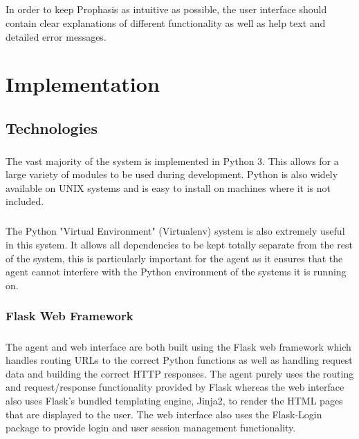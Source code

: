 \documentclass[bsc,logo,twoside]{infthesis}
\begin{document}
\paragraph*{}
	In order to keep Prophasis as intuitive as possible, the user interface should
	contain clear explanations of different functionality as well as help text and
	detailed error messages.

\chapter{Implementation}
\section{Technologies}
\paragraph*{}
	The vast majority of the system is implemented in Python 3.  This allows for a
	large variety of modules to be used during development. Python is also widely
	available on UNIX systems and is easy to install on machines where it is not
	included.

\paragraph*{}
	The Python "Virtual Environment" (Virtualenv) system is also extremely useful
	in this system.  It allows all dependencies to be kept totally separate from
	the rest of the system, this is particularly important for the agent as it
	ensures that the agent cannot interfere with the Python environment of the
	systems it is running on.

\subsection{Flask Web Framework}
\paragraph*{}
	The agent and web interface are both built using the Flask web framework which
	handles routing URLs to the correct Python functions as well as handling
	request data and building the correct HTTP responses. The agent purely uses the
	routing and request/response functionality provided by Flask whereas the web
	interface also uses Flask's bundled templating engine, Jinja2, to render the
	HTML pages that are displayed to the user. The web interface also uses the
	Flask-Login package to provide login and user session management functionality.
\end{document}
